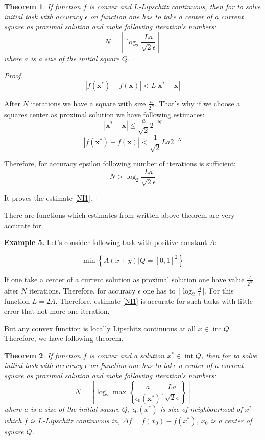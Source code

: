 \documentclass[12pt]{article}
\newtheorem{theorem}{Theorem}[section]
\DeclareMathOperator{\intt}{int}
\begin{document}
\begin{theorem}
If function $f$ is convex and $L$-Lipschitz continuous, then for to solve initial task with accuracy $\epsilon$ on function one has to take a center of a current square as proximal solution and make following iteration's numbers:
\begin{equation}\label{NI1}N = \left\lceil\log_2\frac{La}{\sqrt{2}\epsilon}\right\rceil\end{equation}
where $a$ is a size of the initial square $Q$.
\end{theorem}
\begin{proof}
$$|f(\textbf{x}^*) - f(\textbf{x})| < L|\textbf{x}^* - \textbf{x}|$$

After $N$ iterations we have a square with size $\frac{a}{2^N}$. That's why if we choose a squares center as proximal solution we have following estimates:
$$|\textbf{x}^* - \textbf{x}| \leq \frac{a}{\sqrt{2}}2^{-N}$$
$$|f(\textbf{x}^*) - f(\textbf{x})| < \frac{1}{\sqrt{2}}La2^{-N}$$

Therefore, for accuracy epsilon following number of iterations is sufficient:
$$N > \log_2\frac{La}{\sqrt{2}\epsilon}$$

It proves the estimate \eqref{NI1}.
\end{proof}

There are functions which estimates from written above theorem are very accurate for.

\textbf{Example 5.} Let's consider following task with positive constant $A$:

$$\min\left\{A(x+y)|Q = [0,1]^2\right\}$$

If one take a center of a current solution as proximal solution one have value $\frac{A}{2^N}$ after $N$ iterations. Therefore, for accuracy $\epsilon$ one has to $\lceil\log_2\frac{A}{\epsilon}\rceil$. For this function $L = 2A$. Therefore, estimate \eqref{NI1} is accurate for such tasks with little error that not more one iteration.

But any convex function is locally Lipschitz continuous at all $x \in \intt Q$. Therefore, we have following theorem.

\begin{theorem}
If function $f$ is convex and a solution $x^*\in \intt Q$, then for to solve initial task with accuracy $\epsilon$ on function one has to take a center of a current square as proximal solution and make following iteration's numbers:
\begin{equation}\label{NI2}
N = \left\lceil\log_2\max\left\{\frac{a}{\epsilon_0(\textbf{x}^*)},\frac{La}{\sqrt{2}\epsilon}\right\}\right\rceil
\end{equation}
where $a$ is a size of the initial square $Q$, $\epsilon_0(x^*)$ is size of neighbourhood of $x^*$ which $f$ is $L$-Lipschitz continuous in, $\Delta f =  f(x_0) - f(x^*)$, $x_0$ is a center of square $Q$.
\end{theorem}
\end{document}
